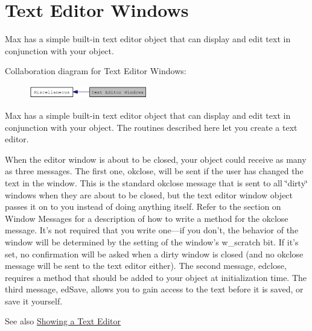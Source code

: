 \hypertarget{group__texteditors}{
\section{Text Editor Windows}
\label{group__texteditors}
}


Max has a simple built-\/in text editor object that can display and edit text in conjunction with your object.  


Collaboration diagram for Text Editor Windows:\nopagebreak
\begin{figure}[H]
\begin{center}
\leavevmode
\includegraphics[width=148pt]{group__texteditors}
\end{center}
\end{figure}
Max has a simple built-\/in text editor object that can display and edit text in conjunction with your object. The routines described here let you create a text editor.

When the editor window is about to be closed, your object could receive as many as three messages. The first one, okclose, will be sent if the user has changed the text in the window. This is the standard okclose message that is sent to all \char`\"{}dirty\char`\"{} windows when they are about to be closed, but the text editor window object passes it on to you instead of doing anything itself. Refer to the section on Window Messages for a description of how to write a method for the okclose message. It’s not required that you write one—if you don’t, the behavior of the window will be determined by the setting of the window’s w\_\-scratch bit. If it’s set, no confirmation will be asked when a dirty window is closed (and no okclose message will be sent to the text editor either). The second message, edclose, requires a method that should be added to your object at initialization time. The third message, edSave, allows you to gain access to the text before it is saved, or save it yourself.

\begin{DoxySeeAlso}{See also}
\hyperlink{chapter_enhancements_chapter_enhancements_ed}{Showing a Text Editor} 
\end{DoxySeeAlso}
